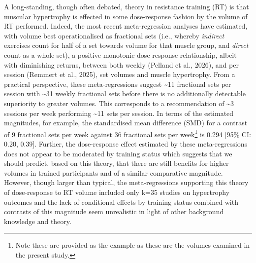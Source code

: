\documentclass[
]{article}
\begin{document}
A long-standing, though often debated, theory in resistance training
(RT) is that muscular hypertrophy is effected in some dose-response
fashion by the volume of RT performed. Indeed, the most recent
meta-regression analyses have estimated, with volume best
operationalised as fractional sets (i.e., whereby \emph{indirect}
exercises count for half of a set towards volume for that muscle group,
and \emph{direct} count as a whole set), a positive monotonic
dose-response relationship, albeit with diminishing returns, between
both weekly (Pelland et al., 2026), and per session (Remmert et al.,
2025), set volumes and muscle hypertrophy. From a practical perspective,
these meta-regressions suggest \textasciitilde11 fractional sets per
session with \textasciitilde31 weekly fractional sets before there is no
additionally detectable superiority to greater volumes. This corresponds
to a recommendation of \textasciitilde3 sessions per week performing
\textasciitilde11 sets per session. In terms of the estimated
magnitudes, for example, the standardised mean difference (SMD) for a
contrast of 9 fractional sets per week against 36 fractional sets per
week\footnote{Note these are provided as the example as these are the
  volumes examined in the present study.} is 0.294 {[}95\% CI: 0.20,
0.39{]}. Further, the dose-response effect estimated by these
meta-regressions does not appear to be moderated by training status
which suggests that we should predict, based on this theory, that there
are still benefits for higher volumes in trained participants and of a
similar comparative magnitude. However, though larger than typical, the
meta-regressions supporting this theory of dose-response to RT volume
included only k=35 studies on hypertrophy outcomes and the lack of
conditional effects by training status combined with contrasts of this
magnitude seem unrealistic in light of other background knowledge and
theory.
\end{document}
